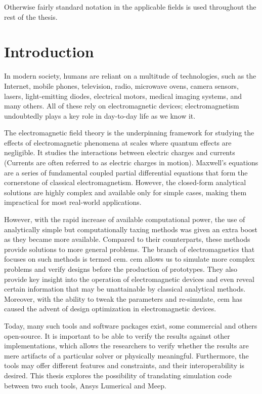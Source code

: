 Otherwise fairly standard notation in the applicable fields is used throughout the rest of the thesis. 

\chapter{Introduction}
In modern society, humans are reliant on a multitude of technologies, such as the Internet, mobile phones, television, radio, microwave ovens, camera sensors, lasers, light-emitting diodes, electrical motors, medical imaging systems, and many others. All of these rely on electromagnetic devices; electromagnetism undoubtedly plays a key role in day-to-day life as we know it.


The electromagnetic field theory is the underpinning framework for studying the effects of electromagnetic phenomena at scales where quantum effects are negligible. It studies the interactions between electric charges and currents (Currents are often referred to as electric charges in motion). Maxwell's equations are a series of fundamental coupled partial differential equations that form the cornerstone of classical electromagnetism. However, the closed-form analytical solutions are highly complex and available only for simple cases, making them impractical for most real-world applications.


However, with the rapid increase of available computational power, the use of analytically simple but computationally taxing methods was given an extra boost as they became more available. Compared to their counterparts, these methods provide solutions to more general problems. The branch of electromagnetics that focuses on such methods is termed \gls{cem}. \gls{cem} allows us to simulate more complex problems and verify designs before the production of prototypes. They also provide key insight into the operation of electromagnetic devices and even reveal certain information that may be unattainable by classical analytical methods. Moreover, with the ability to tweak the parameters and re-simulate, \gls{cem} has caused the advent of design optimization in electromagnetic devices.


Today, many such tools and software packages exist, some commercial and others open-source. It is important to be able to verify the results against other implementations, which allows the researchers to verify whether the results are mere artifacts of a particular solver or physically meaningful. Furthermore, the tools may offer different features and constraints, and their interoperability is desired. This thesis explores the possibility of translating simulation code between two such tools, Ansys Lumerical and Meep.



